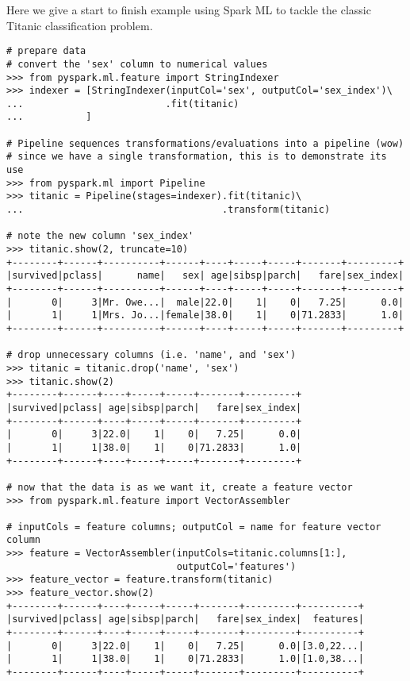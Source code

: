 Here we give a start to finish example using Spark ML to tackle the classic Titanic classification problem. 
\begin{lstlisting}
# prepare data
# convert the 'sex' column to numerical values 
>>> from pyspark.ml.feature import StringIndexer
>>> indexer = [StringIndexer(inputCol='sex', outputCol='sex_index')\
...						    .fit(titanic)
...		  	  ]

# Pipeline sequences transformations/evaluations into a pipeline (wow)
# since we have a single transformation, this is to demonstrate its use
>>> from pyspark.ml import Pipeline
>>> titanic = Pipeline(stages=indexer).fit(titanic)\
...                                   .transform(titanic)

# note the new column 'sex_index'
>>> titanic.show(2, truncate=10)
+--------+------+----------+------+----+-----+-----+-------+---------+
|survived|pclass|      name|   sex| age|sibsp|parch|   fare|sex_index|
+--------+------+----------+------+----+-----+-----+-------+---------+
|       0|     3|Mr. Owe...|  male|22.0|    1|    0|   7.25|      0.0|
|       1|     1|Mrs. Jo...|female|38.0|    1|    0|71.2833|      1.0|
+--------+------+----------+------+----+-----+-----+-------+---------+

# drop unnecessary columns (i.e. 'name', and 'sex')
>>> titanic = titanic.drop('name', 'sex')
>>> titanic.show(2)
+--------+------+----+-----+-----+-------+---------+
|survived|pclass| age|sibsp|parch|   fare|sex_index|
+--------+------+----+-----+-----+-------+---------+
|       0|     3|22.0|    1|    0|   7.25|      0.0|
|       1|     1|38.0|    1|    0|71.2833|      1.0|
+--------+------+----+-----+-----+-------+---------+

# now that the data is as we want it, create a feature vector
>>> from pyspark.ml.feature import VectorAssembler

# inputCols = feature columns; outputCol = name for feature vector column
>>> feature = VectorAssembler(inputCols=titanic.columns[1:], 
                              outputCol='features')
>>> feature_vector = feature.transform(titanic)
>>> feature_vector.show(2)
+--------+------+----+-----+-----+-------+---------+----------+
|survived|pclass| age|sibsp|parch|   fare|sex_index|  features|
+--------+------+----+-----+-----+-------+---------+----------+
|       0|     3|22.0|    1|    0|   7.25|      0.0|[3.0,22...|
|       1|     1|38.0|    1|    0|71.2833|      1.0|[1.0,38...|
+--------+------+----+-----+-----+-------+---------+----------+


\end{lstlisting}
